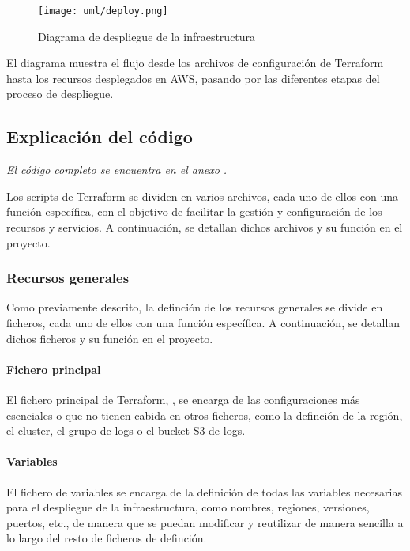 \begin{figure}[H]
    \centering
    \texttt{[image: uml/deploy.png]}
    \caption{Diagrama de despliegue de la infraestructura}
    \label{fig:deployment-diagram}
\end{figure}

El diagrama muestra el flujo desde los archivos de configuración de Terraform
hasta los recursos desplegados en AWS, pasando por las diferentes etapas del
proceso de despliegue.


\newpage{}
\subsection{Explicación del código}\label{sec:impl_configuracion}
\emph{El código completo se encuentra en el anexo .}

Los scripts de Terraform se dividen en varios archivos, cada uno de ellos con
una función específica, con el objetivo de facilitar la gestión y configuración
de los recursos y servicios. A continuación, se detallan dichos archivos y su
función en el proyecto.


\subsubsection{Recursos generales}
Como previamente descrito, la definción de los recursos generales se divide en
ficheros, cada uno de ellos con una función específica. A continuación, se
detallan dichos ficheros y su función en el proyecto.


\paragraph{Fichero principal}
El fichero principal de Terraform, , se encarga de
las configuraciones más esenciales o que no tienen cabida en otros ficheros,
como la definción de la región, el cluster, el grupo de logs o el bucket S3 de
logs.


\paragraph{Variables}
El fichero de variables 
se encarga de la definición de todas las variables necesarias para el despliegue
de la infraestructura, como nombres, regiones, versiones, puertos, etc., de
manera que se puedan modificar y
reutilizar de manera sencilla a lo largo del resto de ficheros de definción.

